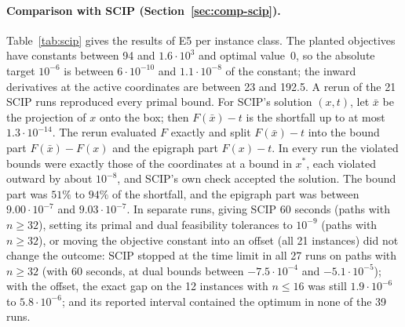 \paragraph{Comparison with SCIP (Section~\ref{sec:comp-scip}).}
Table~\ref{tab:scip} gives the results of E5 per instance class. The planted
objectives have constants between 94 and $1.6\cdot10^3$ and optimal value~$0$,
so the absolute target $10^{-6}$ is between $6\cdot10^{-10}$ and
$1.1\cdot10^{-8}$ of the constant; the inward derivatives at the active
coordinates are between 23 and 192.5. A rerun of the 21 SCIP runs reproduced
every primal bound. For SCIP's solution $(x,t)$, let $\bar x$ be the
projection of $x$ onto the box; then $F(\bar x)-t$ is the shortfall up to at
most $1.3\cdot10^{-14}$. The rerun evaluated $F$ exactly and split
$F(\bar x)-t$ into the bound part $F(\bar x)-F(x)$ and the epigraph part
$F(x)-t$. In every run the violated bounds were exactly those of the
coordinates at a bound in $x^*$, each violated outward by about $10^{-8}$, and
SCIP's own check accepted the solution. The bound part was $51\%$ to $94\%$ of
the shortfall, and the epigraph part was between $9.00\cdot10^{-7}$ and
$9.03\cdot10^{-7}$. In separate runs, giving SCIP 60
seconds (paths with $n\ge32$), setting its primal and dual feasibility
tolerances to $10^{-9}$ (paths with $n\ge32$), or moving the objective
constant into an offset (all 21 instances) did not change the outcome: SCIP
stopped at the time limit in all 27 runs on paths with $n\ge32$ (with 60
seconds, at dual bounds between $-7.5\cdot10^{-4}$ and $-5.1\cdot10^{-5}$);
with the offset, the exact gap on the 12 instances with $n\le16$ was still
$1.9\cdot10^{-6}$ to $5.8\cdot10^{-6}$; and its reported interval contained
the optimum in none of the 39 runs.

